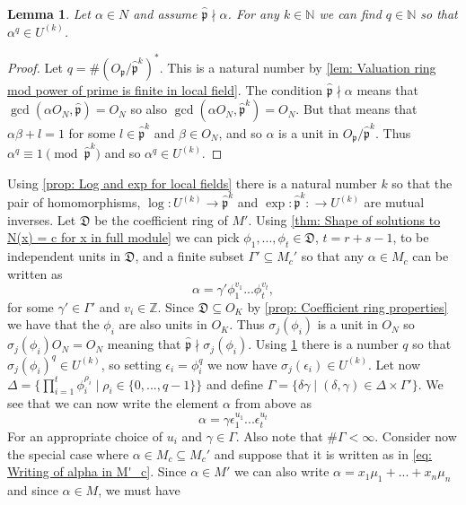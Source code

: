 \documentclass{article}
\newtheorem{lemma}{Lemma}[section]
\newcommand{\mfrak}[1]{\mathfrak{#1}}
\newcommand{\mbb}[1]{\mathbb{#1}}
\numberwithin{equation}{section}
\begin{document}
\begin{lemma}\label{lem: Elements can be mapped to U^(k)}
	Let $\alpha \in N$ and assume $\hat {\mfrak p} \nmid \alpha$. For any $k \in \mbb N$ we can find $q \in \mbb N$ so that $\alpha^q \in U^{(k)}$.
\end{lemma}

\begin{proof}
	Let $q = \# (O_\mfrak p / \hat {\mfrak p}^k)^*$. This is a natural number by \cref{lem: Valuation ring mod power of prime is finite in local field}. The condition $\hat{\mfrak p}\nmid \alpha$ means that $\gcd(\alpha O_N, \hat {\mfrak p}) = O_N$ so also $\gcd(\alpha O_N, \hat {\mfrak p}^k) = O_N$. But that means that $\alpha \beta + l = 1$ for some $l \in {\hat {\mfrak p}}^k$ and $\beta \in O_N$, and so $\alpha$ is a unit in $O_\mfrak p / \hat {\mfrak p}^k$. Thus $\alpha^q \equiv 1 \pmod {\hat{\mfrak p}^k}$ and so $\alpha^q \in U^{(k)}$.
\end{proof}
Using \cref{prop: Log and exp for local fields} there is a natural number $k$ so that the pair of homomorphisms, $\log : U^{(k)} \to \hat {\mfrak p}^k$
and $\exp : \hat {\mfrak p}^k : \to U^{(k)}$ are mutual inverses. Let $\mfrak D$ be the coefficient ring of $M'$. Using \cref{thm: Shape of solutions to N(x) = c for x in full module} we can pick $\phi_1, ..., \phi_t \in \mfrak D$, $t = r + s - 1$, to be independent units in $\mfrak D$, and a finite subset $\Gamma' \subseteq M_c'$ so that any $\alpha \in M_c$ can be written as
$$\alpha = \gamma' \phi_1^{v_1} ... \phi_t^{v_t},$$
for some $\gamma' \in \Gamma'$ and $v_i \in \mbb Z$. Since $\mfrak D \subseteq O_K$ by \cref{prop: Coefficient ring properties} we have that the $\phi_i$ are also units in $O_K$. Thus $\sigma_j(\phi_i)$ is a unit in $O_N$ so $\sigma_j(\phi_i) O_N = O_N$ meaning that $\hat {\mfrak p} \nmid \sigma_j(\phi_i)$. Using \cref{lem: Elements can be mapped to U^(k)} there is a number $q$ so that $\sigma_j(\phi_i)^q \in U^{(k)}$, so setting $\epsilon_i = \phi_i^q$ we now have $\sigma_j(\epsilon_i) \in U^{(k)}$. Let now $\Delta = \{\prod_{i = 1}^t \phi_i^{\rho_i} \mid \rho_i \in \{0, ..., q-1 \} \}$ and define $\Gamma = \{\delta \gamma \mid (\delta, \gamma) \in \Delta \times \Gamma' \}$. We see that we can now write the element $\alpha$ from above as
\begin{equation}\label{eq: Writing of alpha in M'_c}
	\alpha = \gamma \epsilon_1^{u_1} ... \epsilon_t^{u_t}
\end{equation}
For an appropriate choice of $u_i$ and $\gamma \in \Gamma$. Also note that $\# \Gamma < \infty$. Consider now the special case where $\alpha \in M_c \subseteq M_c'$ and suppose that it is written as in \cref{eq: Writing of alpha in M'_c}. Since $\alpha \in M'$ we can also write
$\alpha = x_1 \mu_1 + ... + x_n \mu_n$ and since $\alpha \in M$, we must have
\end{document}

